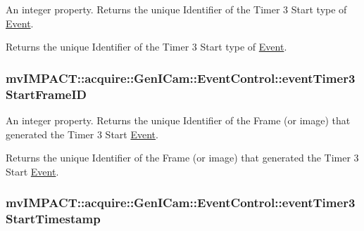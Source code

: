 An integer property. Returns the unique Identifier of the Timer 3 Start type of \hyperlink{classmv_i_m_p_a_c_t_1_1acquire_1_1_event}{Event}. 

Returns the unique Identifier of the Timer 3 Start type of \hyperlink{classmv_i_m_p_a_c_t_1_1acquire_1_1_event}{Event}. \hypertarget{classmv_i_m_p_a_c_t_1_1acquire_1_1_gen_i_cam_1_1_event_control_a5b58090f21c556be3591b13d1e97b082}{
\subsubsection[{event\+Timer3\+Start\+Frame\+I\+D}]{ mv\+I\+M\+P\+A\+C\+T\+::acquire\+::\+Gen\+I\+Cam\+::\+Event\+Control\+::event\+Timer3\+Start\+Frame\+I\+D}}\label{classmv_i_m_p_a_c_t_1_1acquire_1_1_gen_i_cam_1_1_event_control_a5b58090f21c556be3591b13d1e97b082}


An integer property. Returns the unique Identifier of the Frame (or image) that generated the Timer 3 Start \hyperlink{classmv_i_m_p_a_c_t_1_1acquire_1_1_event}{Event}. 

Returns the unique Identifier of the Frame (or image) that generated the Timer 3 Start \hyperlink{classmv_i_m_p_a_c_t_1_1acquire_1_1_event}{Event}. \hypertarget{classmv_i_m_p_a_c_t_1_1acquire_1_1_gen_i_cam_1_1_event_control_a196b4aaa8b91ca3c0e743ae8e18ecc46}{
\subsubsection[{event\+Timer3\+Start\+Timestamp}]{ mv\+I\+M\+P\+A\+C\+T\+::acquire\+::\+Gen\+I\+Cam\+::\+Event\+Control\+::event\+Timer3\+Start\+Timestamp}}\label{classmv_i_m_p_a_c_t_1_1acquire_1_1_gen_i_cam_1_1_event_control_a196b4aaa8b91ca3c0e743ae8e18ecc46}


